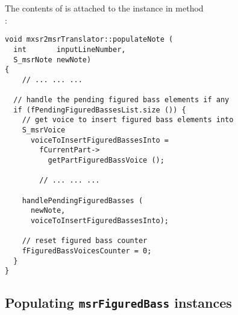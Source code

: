 The contents of  is attached to the  instance in method\\
:
\begin{lstlisting}[language=CPlusPlus]
void mxsr2msrTranslator::populateNote (
  int       inputLineNumber,
  S_msrNote newNote)
{
	// ... ... ...

  // handle the pending figured bass elements if any
  if (fPendingFiguredBassesList.size ()) {
    // get voice to insert figured bass elements into
    S_msrVoice
      voiceToInsertFiguredBassesInto =
        fCurrentPart->
          getPartFiguredBassVoice ();

		// ... ... ...

    handlePendingFiguredBasses (
      newNote,
      voiceToInsertFiguredBassesInto);

    // reset figured bass counter
    fFiguredBassVoicesCounter = 0;
  }
}
\end{lstlisting}


\subsection{Populating {\tt msrFiguredBass} instances}

